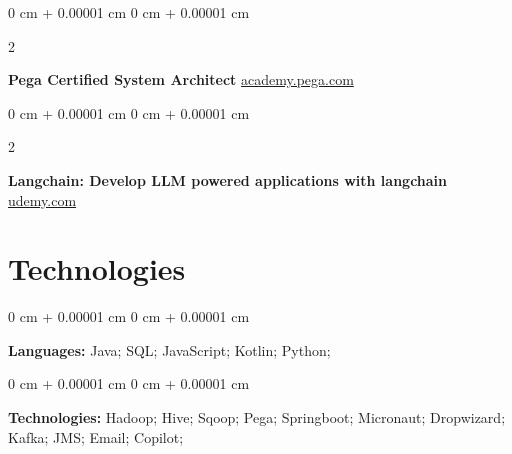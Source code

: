 \documentclass[10pt, letterpaper]{article}
\newenvironment{onecolentry}{
    \begin{adjustwidth}{
        0 cm + 0.00001 cm
    }{
        0 cm + 0.00001 cm
    }
}{
    \end{adjustwidth}
} %
\newenvironment{twocolentry}[2][]{
    \onecolentry
    \def\secondColumn{#2}
    \setcolumnwidth{\fill, 4.5 cm}
    \begin{paracol}{2}
}{
    \switchcolumn \raggedleft \secondColumn
    \end{paracol}
    \endonecolentry
} %
\begin{document}
        \vspace{0.2 cm}

        \begin{twocolentry}{
            \href{https://academy.pega.com/exam/certified-pega-system-architect}{academy.pega.com}
        }
            \textbf{Pega Certified System Architect}\end{twocolentry}


        \vspace{0.2 cm}

        \begin{twocolentry}{
             \href{https://www.udemy.com/certificate/UC-e25667b2-3781-42d-9b6-78804ff7d7fc/}{udemy.com}
        }
            \textbf{Langchain: Develop LLM powered applications with langchain}\end{twocolentry}


    
    \section{Technologies}

        \begin{onecolentry}
            \textbf{Languages:}  Java; SQL; JavaScript; Kotlin; Python;
        \end{onecolentry}

        \vspace{0.2 cm}

        \begin{onecolentry}
            \textbf{Technologies:} Hadoop; Hive; Sqoop; Pega; Springboot; Micronaut; Dropwizard; Kafka; JMS; Email; Copilot; 
        \end{onecolentry}


    
\end{document}
